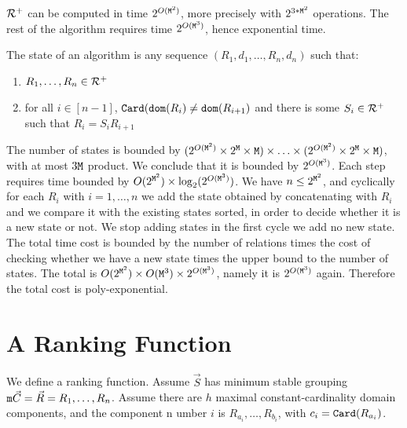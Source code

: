 \documentclass{lmcs}
\begin{document}
${\mathcal R}^+$ can be computed in time $2^{O({\tt M}^2)}$, more precisely with 
$2^{3*{\tt M}^2}$ operations. The rest of the algorithm requires time $2^{O({\tt M}^3)}$,
hence exponential time.

The state of an algorithm is any sequence $(R_1, d_1, \ldots, R_n, d_n)$ such that:
\begin{enumerate}
\item
$R_1, \ldots, R_n \in {\mathcal R}^+$

\item
for all $i \in [n-1]$, ${\tt Card}({\tt dom}(R_i) \not = {\tt dom}(R_{i+1})$ 
and there is some $S_i \in {\mathcal R}^+$ such that $R_i = S_i R_{i+1}$
\end{enumerate}


The number of states is bounded by 
$
(2^{O({\tt M}^2)} \times 2^{\tt M} \times {\tt M})
\times \ldots \times
(2^{O({\tt M}^2)} \times 2^{\tt M} \times {\tt M})
$,
with at most $3{\tt M}$ product. 
We conclude that it is bounded by $2^{O({\tt M}^3)}$. Each step requires time bounded by
$O(2^{{\tt M}^2}) \times \log_2(2^{O({\tt M}^3)})$. 
We have $n \le 2^{{\tt M}^2}$, and cyclically 
for each $R_i$ with $i = 1, \ldots, n$ we add the state obtained by concatenating with 
$R_i$ and we compare it with the existing states sorted, in order to decide whether it is a new
state or not. We stop adding states in the first cycle we add no new state.
The total time cost is bounded by the number of relations times the cost of checking
whether we have a new state times the upper bound to the number of states.
The total is $O(2^{{\tt M}^2}) \times {O({\tt M}^3)} \times 2^{O({\tt M}^3)}$,
namely it is $2^{O({\tt M}^3)}$ again. Therefore the total cost is poly-exponential.


\newpage   \section{A Ranking Function}
We define a ranking function. Assume $\vec{S}$ has minimum stable grouping 
${\tt m}{\vec{C}} = \vec{R} = R_1, \ldots, R_n$. Assume there are $h$ maximal
constant-cardinality domain components, and the component n umber $i$ is  
$R_{a_i}, \ldots ,R_{b_i}$, with $c_i  = {\tt Card}(R_{a_i})$.  
\end{document}
